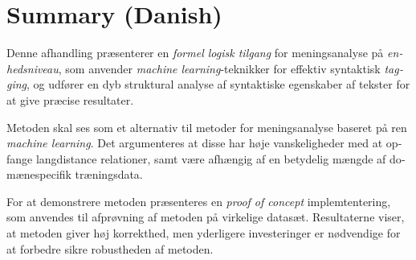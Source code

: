 
\chapter{Summary (Danish)}
\begin{otherlanguage}{danish}

Denne afhandling præsenterer en \emph{formel logisk tilgang} for meningsanalyse på \emph{enhedsniveau}, som anvender \emph{machine learning}-teknikker for effektiv syntaktisk \emph{tagging}, og udfører en dyb struktural analyse af syntaktiske egenskaber af tekster for at give præcise resultater.

Metoden skal ses som et alternativ til metoder for meningsanalyse baseret på ren \emph{machine learning}. Det argumenteres at disse har høje vanskeligheder med at opfange langdistance relationer, samt være afhængig af en betydelig mængde af domænespecifik træningsdata.

For at demonstrere metoden præsenteres en \emph{proof of concept} implemtentering, som anvendes til afprøvning af metoden på virkelige datasæt. Resultaterne viser, at metoden giver høj korrekthed, men yderligere investeringer er nødvendige for at forbedre sikre robustheden af metoden.
\end{otherlanguage}